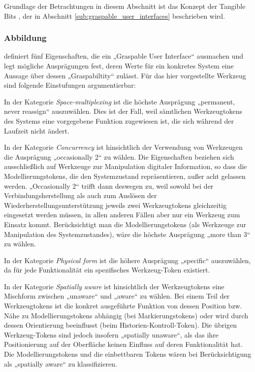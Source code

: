 Grundlage der Betrachtungen in diesem Abschnitt ist das Konzept der Tangible Bits \citep{Fitzmaurice96}, der in Abschnitt \ref{sub:graspable_user_interfaces} beschrieben wird.

\subsubsection{Abbildung}

\citet{Fitzmaurice96} definiert fünf Eigenschaften, die ein „Graspable User Interface“ ausmachen und legt mögliche Ausprägungen fest, deren Werte für ein konkretes System eine Aussage über dessen „Graspabiltity“ zulässt. Für das hier vorgestellte Werkzeug sind folgende Einstufungen argumentierbar:

In der Kategorie \emph{Space-multiplexing} ist die höchste Ausprägung „permanent, never reassign“ auszuwählen. Dies ist der Fall, weil sämtlichen Werkzeugtokens des Systems eine vorgegebene Funktion zugewiesen ist, die sich während der Laufzeit nicht ändert.

In der Kategorie \emph{Concurrency} ist hinsichtlich der Verwendung von Werkzeugen die Ausprägung „occasionally 2“ zu wählen. Die Eigenschaften beziehen sich ausschließlich auf Werkzeuge zur Manipulation digitaler Information, so dass die Modellierungstokens, die den Systemzustand repräsentieren, außer acht gelassen werden. „Occasionally 2“ trifft dann deswegen zu, weil sowohl bei der Verbindungsherstellung als auch zum Auslösen der Wiederherstellungsunterstützung jeweils zwei Werkzeugtokens gleichzeitig eingesetzt werden müssen, in allen anderen Fällen aber nur ein Werkzeug zum Einsatz kommt. Berücksichtigt man die Modellierungstokens (als Werkzeuge zur Manipulation des Systemzustandes), wäre die höchste Ausprägung „more than 3“ zu wählen.

In der Kategorie \emph{Physical form} ist die höhere Ausprägung „specific“ auszuwählen, da für jede Funktionalität ein spezifisches Werkzeug-Token existiert.

In der Kategorie \emph{Spatially aware} ist hinsichtlich der Werkzeugtokens eine Mischform zwischen „unaware“ und „aware“ zu wählen. Bei einem Teil der Werkzeugtokens ist die konkret ausgeführte Funktion von dessen Position bzw. Nähe zu Modellierungstokens abhängig (bei Markierungstokens) oder wird durch dessen Orientierung beeinflusst (beim Historien-Kontroll-Token). Die übrigen Werkzeug-Tokens sind jedoch insofern „spatially unaware“, als das ihre Positionierung auf der Oberfläche keinen Einfluss auf deren Funktionalität hat. Die Modellierungstokens und die einbettbaren Tokens wären bei Berücksichtigung als „spatially aware“ zu klassifizieren.

